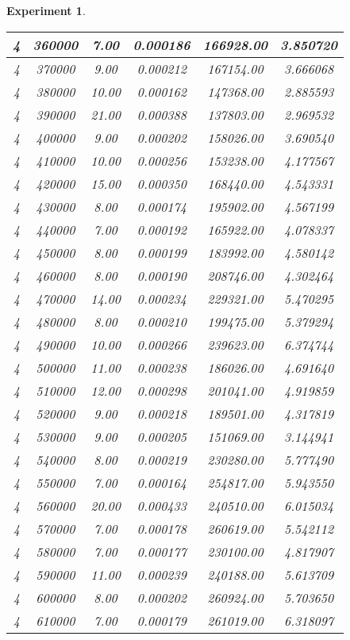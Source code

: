 \documentclass[runningheads,a4paper]{llncs}
\newtheorem{experiment}{Experiment}
\begin{document}
\begin{experiment}
\begin{table}[htpb]
{\begin{tabular}{|c|c|c|c|c|c|}
4 & 360000 & 7.00  & 0.000186 & 166928.00 & 3.850720 \\ \hline
4 & 370000 & 9.00  & 0.000212 & 167154.00 & 3.666068 \\ \hline
4 & 380000 & 10.00 & 0.000162 & 147368.00 & 2.885593 \\ \hline
4 & 390000 & 21.00 & 0.000388 & 137803.00 & 2.969532 \\ \hline
4 & 400000 & 9.00  & 0.000202 & 158026.00 & 3.690540 \\ \hline
4 & 410000 & 10.00 & 0.000256 & 153238.00 & 4.177567 \\ \hline
4 & 420000 & 15.00 & 0.000350 & 168440.00 & 4.543331 \\ \hline
4 & 430000 & 8.00  & 0.000174 & 195902.00 & 4.567199 \\ \hline
4 & 440000 & 7.00  & 0.000192 & 165922.00 & 4.078337 \\ \hline
4 & 450000 & 8.00  & 0.000199 & 183992.00 & 4.580142 \\ \hline
4 & 460000 & 8.00  & 0.000190 & 208746.00 & 4.302464 \\ \hline
4 & 470000 & 14.00 & 0.000234 & 229321.00 & 5.470295 \\ \hline
4 & 480000 & 8.00  & 0.000210 & 199475.00 & 5.379294 \\ \hline
4 & 490000 & 10.00 & 0.000266 & 239623.00 & 6.374744 \\ \hline
4 & 500000 & 11.00 & 0.000238 & 186026.00 & 4.691640 \\ \hline
4 & 510000 & 12.00 & 0.000298 & 201041.00 & 4.919859 \\ \hline
4 & 520000 & 9.00  & 0.000218 & 189501.00 & 4.317819 \\ \hline
4 & 530000 & 9.00  & 0.000205 & 151069.00 & 3.144941 \\ \hline
4 & 540000 & 8.00  & 0.000219 & 230280.00 & 5.777490 \\ \hline
4 & 550000 & 7.00  & 0.000164 & 254817.00 & 5.943550 \\ \hline
4 & 560000 & 20.00 & 0.000433 & 240510.00 & 6.015034 \\ \hline
4 & 570000 & 7.00  & 0.000178 & 260619.00 & 5.542112 \\ \hline
4 & 580000 & 7.00  & 0.000177 & 230100.00 & 4.817907 \\ \hline
4 & 590000 & 11.00 & 0.000239 & 240188.00 & 5.613709 \\ \hline
4 & 600000 & 8.00  & 0.000202 & 260924.00 & 5.703650 \\ \hline
4 & 610000 & 7.00  & 0.000179 & 261019.00 & 6.318097 \\ \hline

\end{tabular}}
\end{table}
\end{experiment}
\end{document}
